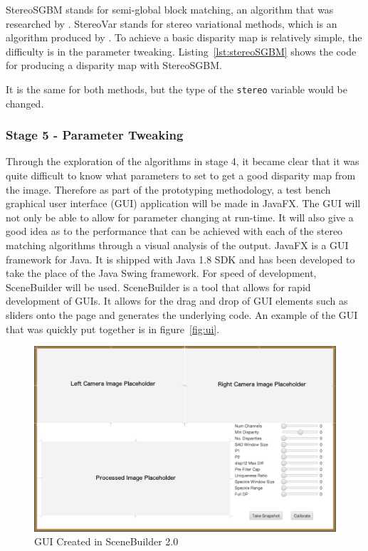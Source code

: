 \documentclass[11pt,oneside]{report}
\newcommand\code[1]{\texttt{#1}}
\begin{document}
		StereoSGBM stands for semi-global block matching, an algorithm that was researched by .
		StereoVar stands for stereo variational methods, which is an algorithm produced by . 
		To achieve a basic disparity map is relatively simple, the difficulty is in the parameter tweaking.
		Listing~\ref{lst:stereoSGBM} shows the code for producing a disparity map with StereoSGBM.
		
		It is the same for both methods, but the type of the \code{stereo} variable would be changed.
		
		\subsubsection{Stage 5 - Parameter Tweaking}
		Through the exploration of the algorithms in stage 4, it became clear that it was quite difficult to know what parameters to set to get a good disparity map from the image.
		Therefore as part of the prototyping methodology, a test bench graphical user interface (GUI) application will be made in JavaFX.
		The GUI will not only be able to allow for parameter changing at run-time.
		It will also give a good idea as to the performance that can be achieved with each of the stereo matching algorithms through a visual analysis of the output.
		JavaFX is a GUI framework for Java.
		It is shipped with Java 1.8 SDK and has been developed to take the place of the Java Swing framework.
		For speed of development, SceneBuilder will be used.
		SceneBuilder is a tool that allows for rapid development of GUIs.
		It allows for the drag and drop of GUI elements such as sliders onto the page and generates the underlying code.
		An example of the GUI that was quickly put together is in figure~\ref{fig:ui}.
		\begin{figure}
			\centering
    				\includegraphics[width=\textheight, angle=90]{ui_design2}
    				\caption{GUI Created in SceneBuilder 2.0 \protect {\label{fig:ui}}}
		\end{figure}	
\end{document}
